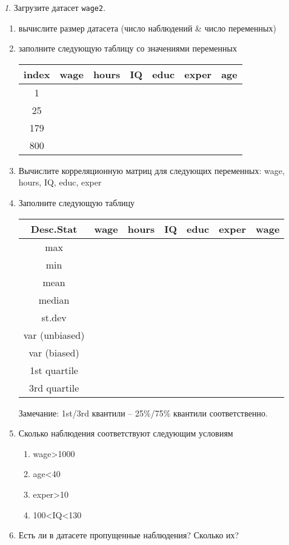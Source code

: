 \documentclass[12pt]{article}
\theoremstyle{remark}
\newtheorem{exercise}{}[section]
\begin{document}
\begin{exercise}
Загрузите датасет \texttt{wage2}.
\begin{enumerate}
	\item вычислите размер датасета (число наблюдений \& число переменных)
	\item заполните следующую таблицу со значениями переменных
	\begin{center}
		\begin{tabular}{|c|c|c|c|c|c|c|} \hline
			index & wage & hours& IQ & educ & exper & age \\ \hline\hline
			1 & & & & & & \\ \hline
			25 & & & &  & & \\ \hline
			179 & & & & & & \\ \hline
			800 & & & & & & \\ \hline
		\end{tabular}
	\end{center}
	\item Вычислите корреляционную матриц для следующих переменных: wage, hours, IQ, educ, exper 
	\item Заполните следующую таблицу
	\begin{center}
		\begin{tabular}{|c|c|c|c|c|c|c|} \hline
			Desc.Stat & wage & hours& IQ & educ & exper & wage \\ \hline\hline
			max & & & & & & \\ \hline
			min & & & & & & \\ \hline
			mean & & & & & & \\ \hline
			median & & & & & & \\ \hline
			st.dev & & & & & & \\ \hline
			var (unbiased) & & & & & & \\ \hline
			var (biased) & & & & & & \\ \hline
			1st quartile & & & & & & \\ \hline
			3rd quartile & & & & & & \\ \hline
		\end{tabular}
	\end{center}
	Замечание: 1st/3rd квантили -- 25\%/75\% квантили соответственно.
	\item Сколько наблюдения соответствуют следующим условиям
		\begin{enumerate}
			\item wage>1000
			\item age<40
			\item exper>10
			\item 100<IQ<130
		\end{enumerate}
	\item Есть ли в датасете пропущенные наблюдения?
	Сколько их?
\end{enumerate}
\end{exercise}
\end{document}
